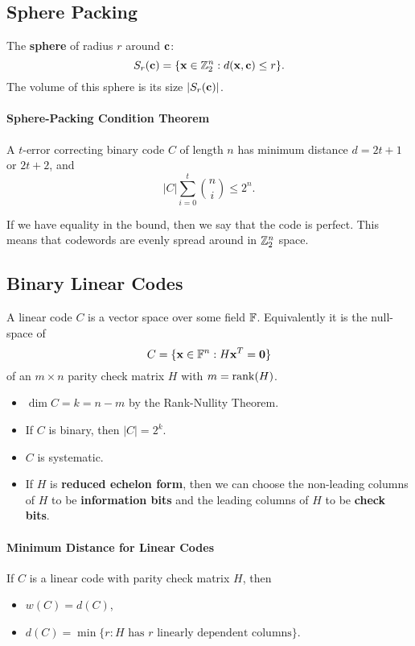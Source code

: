 
\subsection{Sphere Packing}
The \textbf{sphere} of radius \(r\) around \(\mathbf{c}\):
\[S_r(\mathbf{c}) = \{ \mathbf{x} \in \mathbb{Z}_2^n : d(\mathbf{x}, \mathbf{c}) \leq r \}.\]
The volume of this sphere is its size \(|S_r(\mathbf{c})|\).

\paragraph{Sphere-Packing Condition Theorem}
A \(t\)-error correcting binary code \(C\) of length \(n\) has minimum distance \(d = 2t + 1\) or \(2t + 2\), and
\[|C|\sum_{i=0}^t \binom{n}{i} \leq 2^n.\]

If we have equality in the bound, then we say that the code is perfect.  This means that codewords are evenly spread around in \(\mathbb{Z}_2^n\) space.

\subsection{Binary Linear Codes}
A linear code \(C\) is a vector space over some field \(\mathbb{F}\). Equivalently it is the null-space of
\[C = \{\mathbf{x} \in \mathbb{F}^n : H\mathbf{x}^T = \mathbf{0} \}\]
of an \(m \times n\) parity check matrix \(H\) with \(m = \rank(H)\).
\begin{itemize}
    \item \(\dim C = k = n - m\) by the Rank-Nullity Theorem.
    \item If \(C\) is binary, then \(|C| = 2^k\).
    \item \(C\) is systematic.
    \item If \(H\) is \textbf{reduced echelon form}, then we can choose the non-leading columns of \(H\) to be \textbf{information bits} and the leading columns of \(H\) to be \textbf{check bits}.
\end{itemize}

\paragraph{Minimum Distance for Linear Codes}
If \(C\) is a linear code with parity check matrix \(H\), then
\begin{itemize}
    \item\(w(C) = d(C)\),
    \item \(d(C) = \min\{ r: H \text{ has } r \text{ linearly dependent columns} \}\).
\end{itemize}

